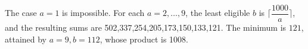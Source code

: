 The case $ a=1 $ is impossible. For each $ a=2,\ldots,9 $, the least eligible $ b $ is $\lceil\dfrac{1000}{a}\rceil $, and the resulting sums are 502,337,254,205,173,150,133,121. The minimum is $\boxed{121}$, attained by $ a=9,b=112 $, whose product is 1008.
